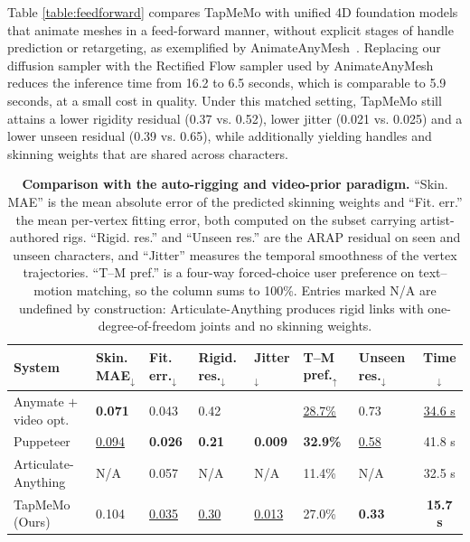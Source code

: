 \documentclass[lettersize,journal]{IEEEtran}
\newcommand{\blu}[1]{\texorpdfstring{{\leavevmode\color{blue}#1}}{#1}}
\begin{document}
\blu{Table \ref{table:feedforward} compares TapMeMo with unified 4D foundation models that animate meshes
in a feed-forward manner, without explicit stages of handle prediction or retargeting, as exemplified
by AnimateAnyMesh~\cite{wu2025animateanymesh}. Replacing our diffusion sampler with the Rectified
Flow sampler used by AnimateAnyMesh reduces the inference time from 16.2 to 6.5 seconds, which is
comparable to 5.9 seconds, at a small cost in quality. Under this matched setting, TapMeMo still
attains a lower rigidity residual (0.37 vs. 0.52), lower jitter (0.021 vs. 0.025) and a lower unseen
residual (0.39 vs. 0.65), while additionally yielding handles and skinning weights that are shared
across characters.}
\begin{table}[t]
  \centering
  \scriptsize
  \setlength{\abovecaptionskip}{0.5mm}
  \setlength{\belowcaptionskip}{0mm}
  \renewcommand{\arraystretch}{1.3}
  \caption{\blu{\textbf{Comparison with the auto-rigging and video-prior paradigm.} ``Skin. MAE'' is the
  mean absolute error of the predicted skinning weights and ``Fit. err.'' the mean per-vertex fitting
  error, both computed on the subset carrying artist-authored rigs. ``Rigid. res.'' and ``Unseen
  res.'' are the ARAP residual on seen and unseen characters, and ``Jitter'' measures the temporal
  smoothness of the vertex trajectories. ``T--M pref.'' is a four-way forced-choice user preference
  on text--motion matching, so the column sums to 100\%. Entries marked N/A are undefined by
  construction: Articulate-Anything produces rigid links with one-degree-of-freedom joints and no
  skinning weights.}}
 \begin{tabularx}{\linewidth}{l >{\centering\arraybackslash}X >{\centering\arraybackslash}X
    >{\centering\arraybackslash}X >{\centering\arraybackslash}X >{\centering\arraybackslash}X
    >{\centering\arraybackslash}X c}
    \toprule[1.5pt]
    \blu{\textbf{System}} & \blu{\textbf{Skin. MAE}$_{\downarrow}$} & \blu{\textbf{Fit. err.}$_{\downarrow}$} &
    \blu{\textbf{Rigid. res.}$_{\downarrow}$} & \blu{\textbf{Jitter}$_{\downarrow}$} &
    \blu{\textbf{T--M pref.}$_{\uparrow}$} & \blu{\textbf{Unseen res.}$_{\downarrow}$} &
    \blu{\textbf{Time}$_{\downarrow}$} \\
    \midrule[0.5pt]
    \blu{Anymate $+$ video opt.} & \blu{\textbf{0.071}} & \blu{0.043} & \blu{0.42} & \blu{{0.018}} & \blu{\underline{28.7\%}} & \blu{0.73} & \blu{\underline{34.6 s}} \\
    \blu{Puppeteer} & \blu{\underline{0.094}} & \blu{\textbf{0.026}} & \blu{\textbf{0.21}} & \blu{\textbf{0.009}} & \blu{\textbf{32.9\%}} & \blu{\underline{0.58}} & \blu{41.8 s} \\
    \blu{Articulate-Anything} & \blu{N/A} & \blu{0.057} & \blu{N/A} & \blu{N/A} & \blu{11.4}\% & \blu{N/A} & \blu{32.5 s} \\
    \midrule[0.5pt]
    \blu{TapMeMo (Ours)} & \blu{0.104} & \blu{\underline{0.035}} & \blu{\underline{0.30}} & \blu{\underline{0.013}} & \blu{27.0}\% & \blu{\textbf{0.33}} & \blu{\textbf{15.7 s}} \\
    \bottomrule[1.5pt]
\end{tabularx}
\label{table:paradigm}
\end{table}
\end{document}
